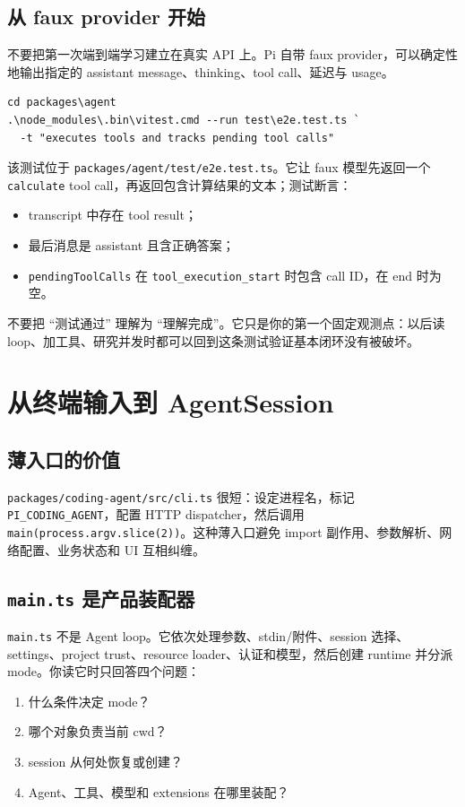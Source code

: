 \documentclass[UTF8,openany,11pt]{ctexbook}
\newcommand{\pathref}[1]{\texttt{#1}}
\begin{document}
\section{从 faux provider 开始}
不要把第一次端到端学习建立在真实 API 上。Pi 自带 faux provider，可以确定性地输出指定的 assistant message、thinking、tool call、延迟与 usage。

\begin{Verbatim}[fontsize=\small]
cd packages\agent
.\node_modules\.bin\vitest.cmd --run test\e2e.test.ts `
  -t "executes tools and tracks pending tool calls"
\end{Verbatim}

该测试位于 \pathref{packages/agent/test/e2e.test.ts}。它让 faux 模型先返回一个 \texttt{calculate} tool call，再返回包含计算结果的文本；测试断言：
\begin{itemize}
\item transcript 中存在 tool result；
\item 最后消息是 assistant 且含正确答案；
\item \texttt{pendingToolCalls} 在 \texttt{tool\_execution\_start} 时包含 call ID，在 end 时为空。
\end{itemize}

\begin{warningbox}
不要把 ``测试通过'' 理解为 ``理解完成''。它只是你的第一个固定观测点：以后读 loop、加工具、研究并发时都可以回到这条测试验证基本闭环没有被破坏。
\end{warningbox}

\chapter{从终端输入到 AgentSession}

\section{薄入口的价值}
\pathref{packages/coding-agent/src/cli.ts} 很短：设定进程名，标记 \texttt{PI\_CODING\_AGENT}，配置 HTTP dispatcher，然后调用 \texttt{main(process.argv.slice(2))}。这种薄入口避免 import 副作用、参数解析、网络配置、业务状态和 UI 互相纠缠。

\section{\texttt{main.ts} 是产品装配器}
\pathref{main.ts} 不是 Agent loop。它依次处理参数、stdin/附件、session 选择、settings、project trust、resource loader、认证和模型，然后创建 runtime 并分派 mode。你读它时只回答四个问题：
\begin{enumerate}
\item 什么条件决定 mode？
\item 哪个对象负责当前 cwd？
\item session 从何处恢复或创建？
\item Agent、工具、模型和 extensions 在哪里装配？
\end{enumerate}
\end{document}
